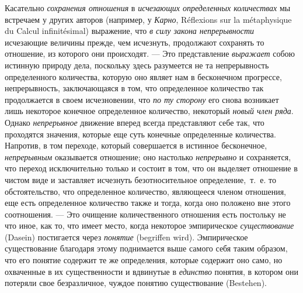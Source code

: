 Касательно {\em сохранения отношения} в
{\em исчезающих определенных количествах} мы встречаем
у других авторов (например, у {\em Карно},
Réflexions sur la métaphysique du Calcul infinitésimal)
выражение, что {\em в силу закона непрерывности}
исчезающие величины прежде, чем исчезнуть, продолжают
сохранять то отношение, из которого они происходят. — Это представление
{\em выражает} собою истинную природу дела, поскольку
здесь разумеется не та непрерывность определенного количества, которую оно
являет нам в бесконечном прогрессе, непрерывность, заключающаяся в том, что
определенное количество так продолжается в своем исчезновении, что
{\em по ту сторону} его снова возникает лишь некоторое
конечное определенное количество, некоторый {\em новый
член ряда}. Однако {\em непрерывное} движение вперед
всегда представляют себе так, что проходятся значения, которые еще суть
конечные определенные количества. Напротив, в том переходе, который
совершается в истинное бесконечное, {\em непрерывным}
оказывается отношение; оно настолько {\em непрерывно} и
сохраняется, что переход исключительно только и состоит в том, что он
выделяет отношение в чистом виде и заставляет исчезнуть безотносительное
определение,~т.~е. то обстоятельство, что определенное количество,
являющееся членом отношения, еще есть определенное количество также и
тогда, когда оно положено вне этого соотношения. — Это очищение
количественного отношения есть постольку не что иное, как то, что имеет
место, когда некоторое эмпирическое {\em существование}
(Dasein) постигается через {\em понятие} (begriffen
wird). Эмпирическое существование благодаря этому поднимается выше самого
себя таким образом, что его понятие содержит те же определения, которые
содержит оно само, но охваченные в их существенности и вдвинутые в
{\em единство} понятия, в котором они потеряли свое
безразличное, чуждое понятию существование (Bestehen).

